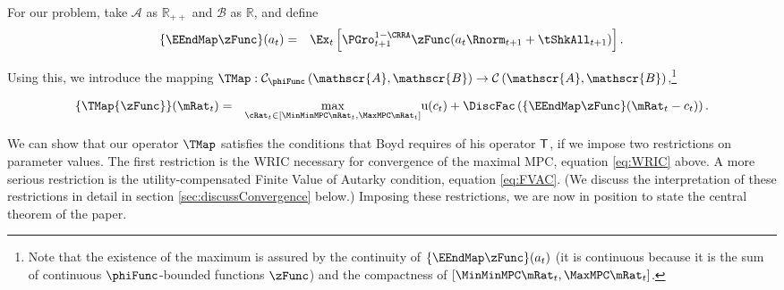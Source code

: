\documentclass[titlepage]{\econtex}\providecommand{\texname}{BufferStockTheory}%
\begin{document}
For our problem, take $\mathscr{A}$ as $\mathbb{R}_{++}$ and $\mathscr{B}$
as $\mathbb{R}$, and define
\begin{eqnarray*}
  \{\EEndMap \zFunc\}(a_{t}) & = & \Ex_{t}\left[\PGro^{1-\CRRA}_{t+1} \zFunc(a_{t} \Rnorm_{t+1} + \tShkAll_{t+1})\right].
\end{eqnarray*}

Using this, we introduce the mapping \textit{$\TMap:\mathcal{C}_{\phiFunc }\left( \mathscr{A},\mathscr{B}\right) \rightarrow \mathcal{C}\left(
    \mathscr{A},\mathscr{B}\right) $},\footnote{Note that the existence of the maximum is assured by the continuity of $\{\EEndMap \zFunc\}(a_{t})$ (it is continuous because it is the sum of continuous $\phiFunc$-bounded functions $\zFunc$) and the compactness of $[\MinMinMPC \mRat_{t},  \MaxMPC \mRat_{t}]$.}
\begin{comment} %
(In the subtle case when $\MinMinMPC=0$, the compact interval could be revised as $ [(\MinMinMPC+\epsilon) \mRat_{t},
  \MaxMPC \mRat_{t}]$ where $\epsilon$ is a very small positive number because obviously $\MinMinMPC \mRat_{t}=0$ will not be the $\argmax$)
\end{comment}
\begin{eqnarray}
\{\TMap{\zFunc}\}(\mRat_{t}) &=&\underset{{\cRat}_{t} \in
[\MinMinMPC \mRat_{t}, \MaxMPC \mRat_{t}]
} \max
\util(c_{t})+\DiscFac \left( \{\EEndMap \zFunc \}(\mRat_{t}-c_{t}) \right)  \label{definitionmappingT}.
%
\end{eqnarray}


\begin{comment}
Unpacking the definitions, our mapping $\TMap$ can be written more explicitly as
\begin{eqnarray}
\{\TMap\zFunc\}(\mRat_{t}) &=&\underset{\cRat_{t} \in [\MinMinMPC
  \mRat_{t}, \MaxMPC \mRat_{t}]} \max \left\{
\util(c_{t})+\DiscFac \Ex_{t}\left[ {\PGro}_{t+1} ^{1-\CRRA }\zFunc(
{\aRat}_{t}\Rnorm_{t+1}+\tShkAll_{t+1}) \right] \right\}
.
\end{eqnarray}
\end{comment}

\hypertarget{Contraction-Conditions}{}

We can show that our operator $\TMap$ satisfies the conditions that
Boyd requires of his operator $\mathsf{T}$, if we impose two restrictions
on parameter values.  The first restriction is the WRIC necessary for
convergence of the maximal MPC, equation \eqref{eq:WRIC} above.  A
more serious restriction is the utility-compensated Finite Value of
Autarky condition, equation \eqref{eq:FVAC}.  (We discuss the
interpretation of these restrictions in detail in section
\ref{sec:discussConvergence} below.)  Imposing these restrictions, we
are now in position to state the central theorem of the paper.
\end{document}

